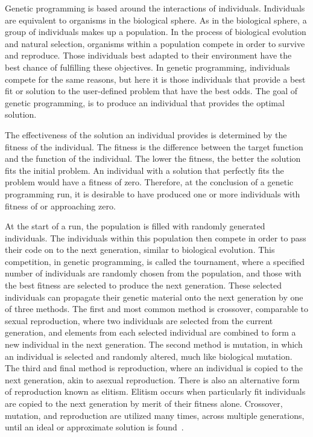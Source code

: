 \documentclass[12pt]{article}
\begin{document}
Genetic programming is based around the interactions of individuals. Individuals are equivalent to organisms in the biological sphere. As in the biological sphere, a group of individuals makes up a population. In the process of biological evolution and natural selection, organisms within a population compete in order to survive and reproduce. Those individuals best adapted to their environment have the best chance of fulfilling these objectives.  In genetic programming, individuals compete for the same reasons, but here it is those individuals that provide a best fit or solution to the user-defined problem that have the best odds. The goal of genetic programming, is to produce an individual that provides the optimal solution.

The effectiveness of the solution an individual provides is determined by the fitness of the individual. The fitness is the difference between the target function and the function of the individual. The lower the fitness, the better the solution fits the initial problem. An individual with a solution that perfectly fits the problem would have a fitness of zero. Therefore, at the conclusion of a genetic programming run, it is desirable to have produced one or more individuals with fitness of or approaching zero.

At the start of a run, the population is filled with randomly generated individuals. The individuals within this population then compete in order to pass their code on to the next generation, similar to biological evolution. This competition, in genetic programming, is called the tournament, where a specified number of individuals are randomly chosen from the population, and those with the best fitness are selected to produce the next generation. These selected individuals can propagate their genetic material onto the next generation by one of three methods. The first and most common method is crossover, comparable to sexual reproduction, where two individuals are selected from the current generation, and elements from each selected individual are combined to form a new individual in the next generation. The second method is mutation, in which an individual is selected and randomly altered, much like biological mutation. The third and final method is reproduction, where an individual is copied to the next generation, akin to asexual reproduction. There is also an alternative form of reproduction known as elitism. Elitism occurs when particularly fit individuals are copied to the next generation by merit of their fitness alone. Crossover, mutation, and reproduction are utilized many times, across multiple generations, until an ideal or approximate solution is found~\cite{poli08:fieldguide}.
\end{document}
